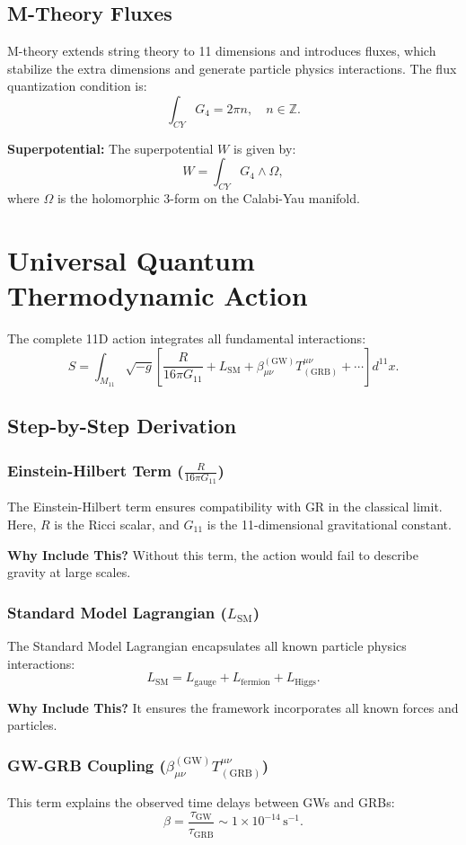 \documentclass[12pt,a4paper]{article}
\begin{document}
\subsection{M-Theory Fluxes}
M-theory extends string theory to 11 dimensions and introduces fluxes, which stabilize the extra dimensions and generate particle physics interactions. The flux quantization condition is:
\[
\int_{CY} G_4 = 2\pi n, \quad n \in \mathbb{Z}.
\]

\textbf{Superpotential:} The superpotential $W$ is given by:
\[
W = \int_{CY} G_4 \wedge \Omega,
\]
where $\Omega$ is the holomorphic 3-form on the Calabi-Yau manifold.

\section{Universal Quantum Thermodynamic Action}
The complete 11D action integrates all fundamental interactions:
\[
S = \int_{M_{11}} \sqrt{-g} \left[ \frac{R}{16\pi G_{11}} + L_{\text{SM}} + \beta^{(\text{GW})}_{\mu\nu} T^{\mu\nu}_{(\text{GRB})} + \cdots \right] d^{11}x.
\]

\subsection{Step-by-Step Derivation}
\subsubsection{Einstein-Hilbert Term ($\frac{R}{16\pi G_{11}}$)}
The Einstein-Hilbert term ensures compatibility with GR in the classical limit. Here, $R$ is the Ricci scalar, and $G_{11}$ is the 11-dimensional gravitational constant.

\textbf{Why Include This?} Without this term, the action would fail to describe gravity at large scales.

\subsubsection{Standard Model Lagrangian ($L_{\text{SM}}$)}
The Standard Model Lagrangian encapsulates all known particle physics interactions:
\[
L_{\text{SM}} = L_{\text{gauge}} + L_{\text{fermion}} + L_{\text{Higgs}}.
\]

\textbf{Why Include This?} It ensures the framework incorporates all known forces and particles.

\subsubsection{GW-GRB Coupling ($\beta^{(\text{GW})}_{\mu\nu} T^{\mu\nu}_{(\text{GRB})}$)}
This term explains the observed time delays between GWs and GRBs:
\[
\beta = \frac{\tau_{\text{GW}}}{\tau_{\text{GRB}}} \sim 1 \times 10^{-14} \, \text{s}^{-1}.
\]
\end{document}
